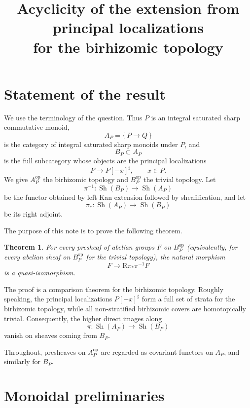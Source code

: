 \documentclass{article}
\newtheorem{theorem}{Theorem}[section]
\theoremstyle{definition}
\begin{document}
\title{Acyclicity of the extension from principal localizations\\ for the birhizomic topology}
\author{}
\date{}
\maketitle

\section{Statement of the result}

We use the terminology of the question.  Thus \(P\) is an integral saturated sharp commutative monoid,
\[
A_P=\{\,P\to Q\,\}
\]
is the category of integral saturated sharp monoids under \(P\), and
\[
B_P\subset A_P
\]
is the full subcategory whose objects are the principal localizations
\[
P\longrightarrow P[-x]^\sharp,\qquad x\in P.
\]
We give \(A_P^{\mathrm{op}}\) the birhizomic topology and \(B_P^{\mathrm{op}}\) the trivial topology.  Let
\[
\pi^{-1}:\operatorname{Sh}(B_P)\longrightarrow \operatorname{Sh}(A_P)
\]
be the functor obtained by left Kan extension followed by sheafification, and let
\[
\pi_*:\operatorname{Sh}(A_P)\longrightarrow \operatorname{Sh}(B_P)
\]
be its right adjoint.

The purpose of this note is to prove the following theorem.

\begin{theorem}\label{thm:main}
For every presheaf of abelian groups \(F\) on \(B_P^{\mathrm{op}}\) (equivalently, for every abelian sheaf on \(B_P^{\mathrm{op}}\) for the trivial topology), the natural morphism
\[
F\longrightarrow \mathrm R\pi_*\pi^{-1}F
\]
is a quasi-isomorphism.
\end{theorem}

The proof is a comparison theorem for the birhizomic topology.  Roughly speaking, the principal localizations \(P[-x]^\sharp\) form a full set of strata for the birhizomic topology, while all non-stratified birhizomic covers are homotopically trivial.  Consequently, the higher direct images along
\[
\pi:\operatorname{Sh}(A_P)\longrightarrow \operatorname{Sh}(B_P)
\]
vanish on sheaves coming from \(B_P\).

Throughout, presheaves on \(A_P^{\mathrm{op}}\) are regarded as covariant functors on \(A_P\), and similarly for \(B_P\).

\section{Monoidal preliminaries}
\end{document}
